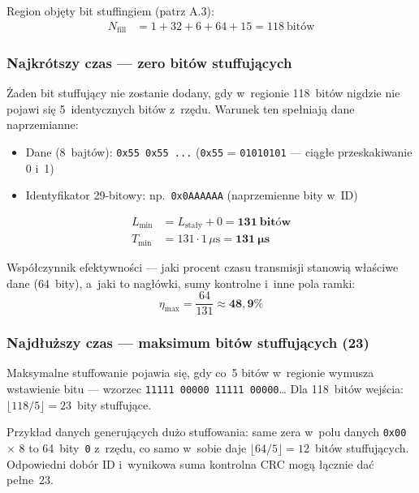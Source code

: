 \documentclass[12pt,a4paper]{article}
\begin{document}
Region objęty bit stuffingiem (patrz A.3):
\begin{align*}
N_{\text{fill}} &= 1 + 32 + 6 + 64 + 15 = 118\ \text{bitów}
\end{align*}

\subsubsection*{Najkrótszy czas — zero bitów stuffujących}

Żaden bit stuffujący nie zostanie dodany, gdy w~regionie 118~bitów nigdzie
nie pojawi się 5~identycznych bitów z~rzędu. Warunek ten spełniają dane
naprzemianne:
\begin{itemize}
    \item Dane (8~bajtów): \texttt{0x55 0x55 ...} (\texttt{0x55} =
          \texttt{01010101} — ciągłe przeskakiwanie 0 i~1)
    \item Identyfikator 29-bitowy: np.\ \texttt{0x0AAAAAA}
          (naprzemienne bity w~ID)
\end{itemize}

\begin{align*}
L_{\min} &= L_{\text{stały}} + 0 = \mathbf{131\ \text{bitów}} \\
T_{\min} &= 131 \cdot 1\,\mu\text{s} = \mathbf{131\ \mu\text{s}}
\end{align*}

Współczynnik efektywności — jaki procent czasu transmisji stanowią właściwe
dane (64~bity), a~jaki to nagłówki, sumy kontrolne i~inne pola ramki:
\begin{equation}
\eta_{\max} = \frac{64}{131} \approx \mathbf{48{,}9\%}
\end{equation}

\subsubsection*{Najdłuższy czas — maksimum bitów stuffujących (23)}

Maksymalne stuffowanie pojawia się, gdy co~5 bitów w~regionie wymusza
wstawienie bitu — wzorzec \texttt{11111\,00000\,11111\,00000}\ldots
Dla 118~bitów wejścia: $\lfloor 118 / 5 \rfloor = 23$~bity stuffujące.

Przykład danych generujących dużo stuffowania: same zera w~polu danych
\texttt{0x00} $\times$ 8 to 64~bity~\texttt{0} z~rzędu, co samo w~sobie daje
$\lfloor 64/5 \rfloor = 12$~bitów stuffujących. Odpowiedni dobór ID i~wynikowa
suma kontrolna CRC mogą łącznie dać pełne~23.
\end{document}
